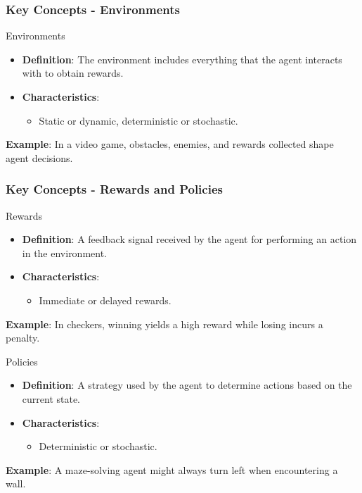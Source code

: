 \documentclass{beamer}
\begin{document}
\begin{frame}[fragile]
    \frametitle{Key Concepts - Environments}
    \begin{block}{Environments}
        \begin{itemize}
            \item \textbf{Definition}: The environment includes everything that the agent interacts with to obtain rewards.
            \item \textbf{Characteristics}:
                \begin{itemize}
                    \item Static or dynamic, deterministic or stochastic.
                \end{itemize}
        \end{itemize}
    \end{block}
    \textbf{Example}: In a video game, obstacles, enemies, and rewards collected shape agent decisions.
\end{frame}

\begin{frame}[fragile]
    \frametitle{Key Concepts - Rewards and Policies}
    \begin{block}{Rewards}
        \begin{itemize}
            \item \textbf{Definition}: A feedback signal received by the agent for performing an action in the environment.
            \item \textbf{Characteristics}:
                \begin{itemize}
                    \item Immediate or delayed rewards.
                \end{itemize}
        \end{itemize}
    \end{block}
    \textbf{Example}: In checkers, winning yields a high reward while losing incurs a penalty.
    
    \begin{block}{Policies}
        \begin{itemize}
            \item \textbf{Definition}: A strategy used by the agent to determine actions based on the current state.
            \item \textbf{Characteristics}:
                \begin{itemize}
                    \item Deterministic or stochastic.
                \end{itemize}
        \end{itemize}
    \end{block}
    \textbf{Example}: A maze-solving agent might always turn left when encountering a wall.
\end{frame}
\end{document}
